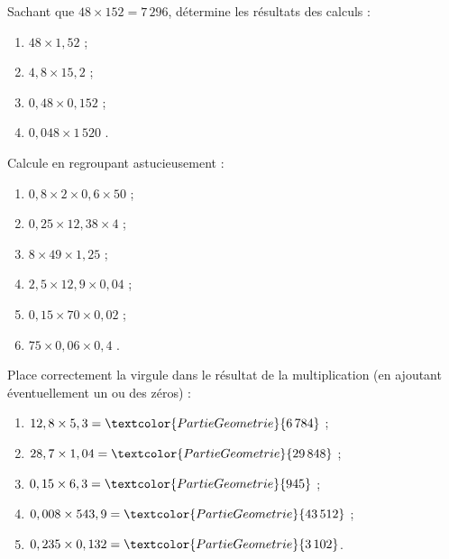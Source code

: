 \begin{exercice}
Sachant que $48 \times 152 = 7\,296$, détermine les résultats des calculs :
\begin{enumerate} 
 \item $48 \times 1,52$ \dotfill ; 
 
 \item $4,8 \times 15,2$ \dotfill ; 
 
 \item $0,48 \times 0,152$ \dotfill ; 
 
 \item $0,048 \times 1\,520$ \dotfill. 
 \end{enumerate} 
\end{exercice}
\begin{exercice}
Calcule en regroupant astucieusement :
\begin{enumerate} 
 \item $0,8 \times 2 \times 0,6 \times 50$ \dotfill ; 
 
 \item $0,25 \times 12,38 \times 4$ \dotfill ; 
 
 \item $8 \times 49 \times 1,25$ \dotfill ; 
 
 \item $2,5 \times 12,9 \times 0,04$ \dotfill ; 
 
 \item $0,15 \times 70 \times 0,02$ \dotfill ; 
 
 \item $75 \times 0,06 \times 0,4$ \dotfill. 
 
 \end{enumerate} 
\end{exercice}
\begin{exercice}
Place correctement la virgule dans le résultat de la multiplication (en ajoutant éventuellement un ou des zéros) :
\begin{enumerate} 
 \item $12,8 \times  5,3 = \textcolor{PartieGeometrie}{6\,784}$ ;
 \item $28,7 \times 1,04 = \textcolor{PartieGeometrie}{29\,848}$ ;
 \item $0,15 \times 6,3 = \textcolor{PartieGeometrie}{945}$ ;
 \item $0,008 \times 543,9 = \textcolor{PartieGeometrie}{43\,512}$ ;
 \item $0,235 \times 0,132 = \textcolor{PartieGeometrie}{3\,102}$.
 \end{enumerate}
\end{exercice}
